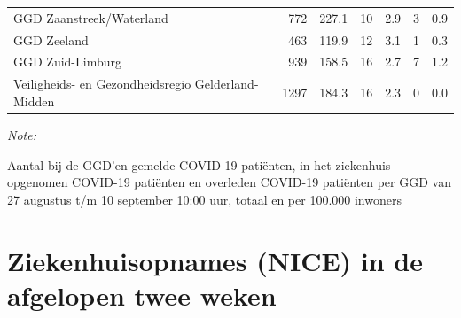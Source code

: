 \documentclass[
  english,
  man,floatsintext]{apa6}
\begin{document}
\begin{table}
\begin{threeparttable}
\begin{tabular}{lrrrrrr}
GGD Zaanstreek/Waterland & 772 & 227.1 & 10 & 2.9 & 3 & 0.9\\
GGD Zeeland & 463 & 119.9 & 12 & 3.1 & 1 & 0.3\\
GGD Zuid-Limburg & 939 & 158.5 & 16 & 2.7 & 7 & 1.2\\
Veiligheids- en Gezondheidsregio Gelderland-Midden & 1297 & 184.3 & 16 & 2.3 & 0 & 0.0\\
\bottomrule
\end{tabular}
\begin{tablenotes}
\item \textit{Note: } 
\item Aantal bij de GGD’en gemelde COVID-19 patiënten, in het ziekenhuis opgenomen COVID-19 patiënten en overleden COVID-19 patiënten per GGD van 27 augustus t/m 10 september 10:00 uur, totaal en per 100.000 inwoners
\end{tablenotes}
\end{threeparttable}
\endgroup{}
\end{table}

\newpage

\hypertarget{ziekenhuisopnames-nice-in-de-afgelopen-twee-weken}{%
\section{Ziekenhuisopnames (NICE) in de afgelopen twee weken}\label{ziekenhuisopnames-nice-in-de-afgelopen-twee-weken}}
\end{document}

